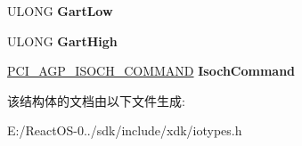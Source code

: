 \begin{DoxyCompactItemize}
U\+L\+O\+NG {\bfseries Gart\+Low}
\item 
\mbox{\label{struct_p_c_i___a_g_p___e_x_t_e_n_d_e_d___c_a_p_a_b_i_l_i_t_y_a87eb6f1c00f97564d2ac4ca2e13548ea}} 
U\+L\+O\+NG {\bfseries Gart\+High}
\item 
\mbox{\label{struct_p_c_i___a_g_p___e_x_t_e_n_d_e_d___c_a_p_a_b_i_l_i_t_y_a8a1401153432411f7138f477d713e038}} 
\hyperlink{struct___p_c_i___a_g_p___i_s_o_c_h___c_o_m_m_a_n_d}{P\+C\+I\+\_\+\+A\+G\+P\+\_\+\+I\+S\+O\+C\+H\+\_\+\+C\+O\+M\+M\+A\+ND} {\bfseries Isoch\+Command}
\end{DoxyCompactItemize}


该结构体的文档由以下文件生成\+:\begin{DoxyCompactItemize}
\item 
E\+:/\+React\+O\+S-\/0../sdk/include/xdk/iotypes.\+h\end{DoxyCompactItemize}
